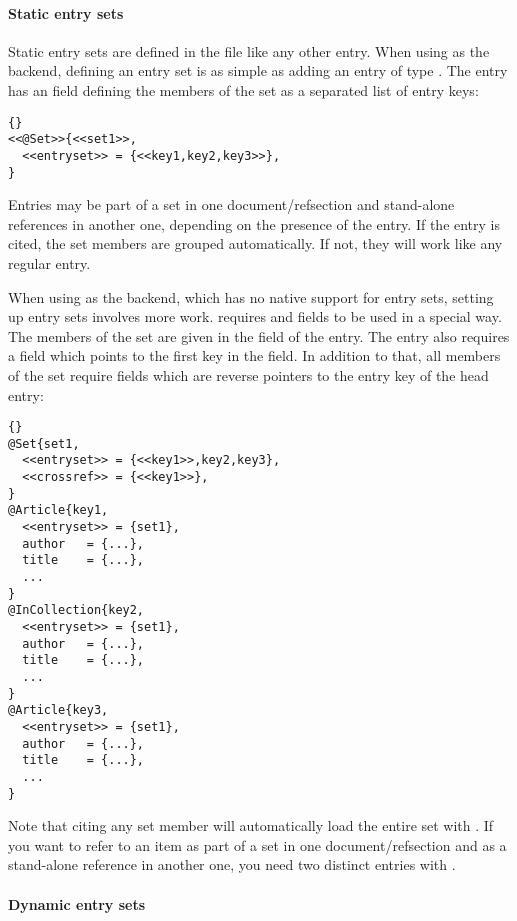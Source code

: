 \paragraph{Static entry sets}

\BiberOnlyMark Static entry sets are defined in the  file like any other entry. When using \biber as the backend, defining an entry set is as simple as adding an entry of type . The entry has an  field defining the members of the set as a separated list of entry keys:

\begin{lstlisting}[style=bibtex]{}
<<@Set>>{<<set1>>,
  <<entryset>> = {<<key1,key2,key3>>},
}
\end{lstlisting}
%
Entries may be part of a set in one document\slash refsection and stand-alone references in another one, depending on the presence of the  entry. If the  entry is cited, the set members are grouped automatically. If not, they will work like any regular entry.

When using \bibtex as the backend, which has no native support for entry sets, setting up entry sets involves more work. \bibtex requires  and  fields to be used in a special way. The members of the set are given in the  field of the  entry. The  entry also requires a  field which points to the first key in the  field. In addition to that, all members of the set require  fields which are reverse pointers to the entry key of the  head entry:

\begin{lstlisting}[style=bibtex]{}
@Set{set1,
  <<entryset>> = {<<key1>>,key2,key3},
  <<crossref>> = {<<key1>>},
}
@Article{key1,
  <<entryset>> = {set1},
  author   = {...},
  title    = {...},
  ...
}
@InCollection{key2,
  <<entryset>> = {set1},
  author   = {...},
  title    = {...},
  ...
}
@Article{key3,
  <<entryset>> = {set1},
  author   = {...},
  title    = {...},
  ...
}
\end{lstlisting}
%
Note that citing any set member will automatically load the entire set with \bibtex. If you want to refer to an item as part of a set in one document\slash refsection and as a stand-alone reference in another one, you need two distinct entries with \bibtex.

\paragraph[Dynamic entry sets]{Dynamic entry sets\BiberOnlyMark}

